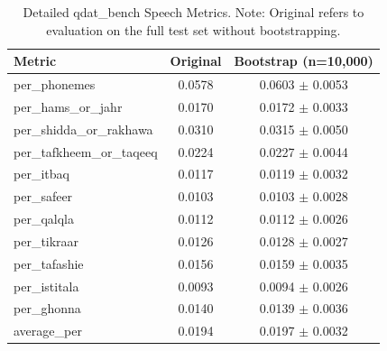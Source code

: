 \begin{table}[t]
	\centering
	\begin{tabular}{lcc}
		\hline
		\textbf{Metric}           & \textbf{Original} & \textbf{Bootstrap (n=10,000)} \\
		\hline
		per\_phonemes             & 0.0578            & 0.0603 $\pm$ 0.0053           \\
		per\_hams\_or\_jahr       & 0.0170            & 0.0172 $\pm$ 0.0033           \\
		per\_shidda\_or\_rakhawa  & 0.0310            & 0.0315 $\pm$ 0.0050           \\
		per\_tafkheem\_or\_taqeeq & 0.0224            & 0.0227 $\pm$ 0.0044           \\
		per\_itbaq                & 0.0117            & 0.0119 $\pm$ 0.0032           \\
		per\_safeer               & 0.0103            & 0.0103 $\pm$ 0.0028           \\
		per\_qalqla               & 0.0112            & 0.0112 $\pm$ 0.0026           \\
		per\_tikraar              & 0.0126            & 0.0128 $\pm$ 0.0027           \\
		per\_tafashie             & 0.0156            & 0.0159 $\pm$ 0.0035           \\
		per\_istitala             & 0.0093            & 0.0094 $\pm$ 0.0026           \\
		per\_ghonna               & 0.0140            & 0.0139 $\pm$ 0.0036           \\
		average\_per              & 0.0194            & 0.0197 $\pm$ 0.0032           \\
		\hline
	\end{tabular}
	\caption{Detailed qdat\_bench Speech Metrics. Note: Original refers to evaluation on the full test set without bootstrapping.}
	\label{tab:qdat_speech_metrics}
\end{table}

